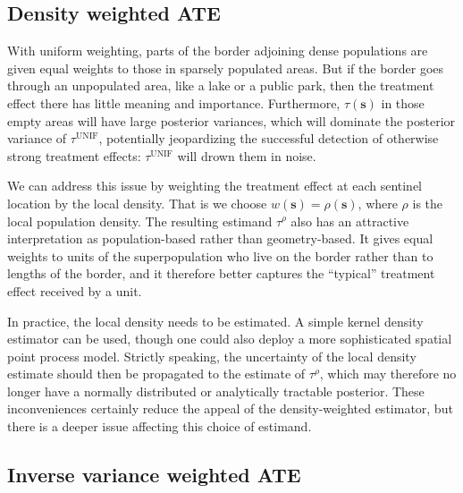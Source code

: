 \documentclass[letter]{article}
\newcommand{\svec}{\mathbold{s}}
\newcommand{\unifavg}{\tau^{\mathrm{UNIF}}}
\newcommand{\taurho}{\tau^{\rho}}
\begin{document}
    	\subsection{Density weighted ATE}\label{density-weighted-ate}

With uniform weighting, parts of the border adjoining dense populations are given equal weights to those in sparsely populated areas.
But if the border goes through an unpopulated area, like a lake or a public park, then the treatment effect there has little meaning and importance.
Furthermore, \(\tau(\svec)\) in those empty areas will have large posterior variances, which will dominate the posterior variance of \(\unifavg\), potentially jeopardizing the successful detection of otherwise strong treatment effects: \(\unifavg\) will drown them in noise.

We can address this issue by weighting the treatment effect at each sentinel location by the local density.
That is we choose \(w(\svec) = \rho(\svec)\), where \(\rho\) is the local population density.
The resulting estimand \(\taurho\) also has an attractive interpretation as population-based rather than geometry-based.
It gives equal weights to units of the superpopulation who live on the border rather than to lengths of the border,
and it therefore better captures the ``typical'' treatment effect received by a unit.

In practice, the local density needs to be estimated.
A simple kernel density estimator can be used,
though one could also deploy a more sophisticated spatial point process model.
Strictly speaking, the uncertainty of the local density estimate should then be propagated to the estimate of \(\taurho\), which may therefore no longer have a normally distributed or analytically tractable posterior.
These inconveniences certainly reduce the appeal of the density-weighted estimator,
but there is a deeper issue affecting this choice of estimand.
    


    	\subsection{Inverse variance weighted ATE}\label{inverse-variance-weighted-ate}
\end{document}
